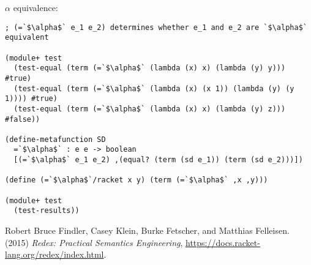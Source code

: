 $\alpha$ equivalence:

\begin{lstlisting}[frame=none,numbers=none]
; (=`$\alpha$` e_1 e_2) determines whether e_1 and e_2 are `$\alpha$` equivalent

(module+ test
  (test-equal (term (=`$\alpha$` (lambda (x) x) (lambda (y) y))) #true)
  (test-equal (term (=`$\alpha$` (lambda (x) (x 1)) (lambda (y) (y 1)))) #true)
  (test-equal (term (=`$\alpha$` (lambda (x) x) (lambda (y) z))) #false))

(define-metafunction SD
  =`$\alpha$` : e e -> boolean
  [(=`$\alpha$` e_1 e_2) ,(equal? (term (sd e_1)) (term (sd e_2)))])

(define (=`$\alpha$`/racket x y) (term (=`$\alpha$` ,x ,y)))

(module+ test
  (test-results))
\end{lstlisting}

\begin{thebibliography}{9}
Robert Bruce Findler, Casey Klein, Burke Fetscher, and Matthias Felleisen.
(2015) \emph{Redex: Practical Semantics Engineering},
\url{https://docs.racket-lang.org/redex/index.html}.
\end{thebibliography}
